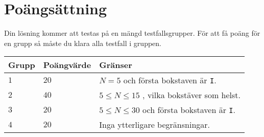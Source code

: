 \section*{Poängsättning}
Din lösning kommer att testas på en mängd testfallsgrupper.
För att få poäng för en grupp så måste du klara alla testfall i gruppen.
\noindent
\begin{tabular}{| l | l | l |}
\hline
  Grupp & Poängvärde & Gränser \\ \hline
  $1$    & $20$       &  $N=5$ och första bokstaven är \texttt{I}.\\ \hline 
  $2$    & $40$       &  $5\le N\le 15$ , vilka bokstäver som helst.\\ \hline 
  $3$    & $20$       &  $5\le N\le 30$ och första bokstaven är \texttt{I}.\\ \hline 
  $4$    & $20$       &  Inga ytterligare begränsningar. \\ \hline
\end{tabular}
